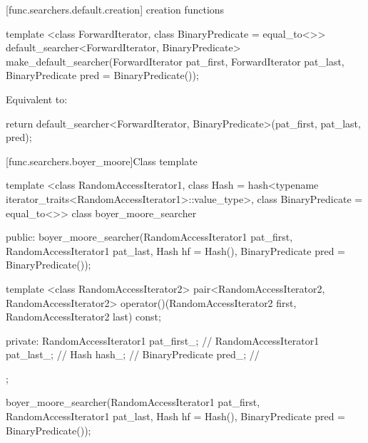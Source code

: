 [func.searchers.default.creation]{ creation functions}

%
\begin{itemdecl}
template <class ForwardIterator, class BinaryPredicate = equal_to<>>
  default_searcher<ForwardIterator, BinaryPredicate>
    make_default_searcher(ForwardIterator pat_first, ForwardIterator pat_last,
                          BinaryPredicate pred = BinaryPredicate());
\end{itemdecl}

\begin{itemdescr}
\pnum
\effects
Equivalent to:
\begin{codeblock}
return default_searcher<ForwardIterator, BinaryPredicate>(pat_first, pat_last, pred);
\end{codeblock}
\end{itemdescr}

[func.searchers.boyer_moore]{Class template }

%
\begin{codeblock}
template <class RandomAccessIterator1,
          class Hash = hash<typename iterator_traits<RandomAccessIterator1>::value_type>,
          class BinaryPredicate = equal_to<>>
class boyer_moore_searcher {
public:
  boyer_moore_searcher(RandomAccessIterator1 pat_first,
                       RandomAccessIterator1 pat_last, Hash hf = Hash(),
                       BinaryPredicate pred = BinaryPredicate());

  template <class RandomAccessIterator2>
    pair<RandomAccessIterator2, RandomAccessIterator2>
      operator()(RandomAccessIterator2 first,
                 RandomAccessIterator2 last) const;

private:
  RandomAccessIterator1 pat_first_; // \expos
  RandomAccessIterator1 pat_last_;  // \expos
  Hash hash_;                       // \expos
  BinaryPredicate pred_;            // \expos
};
\end{codeblock}

%
\begin{itemdecl}
boyer_moore_searcher(RandomAccessIterator1 pat_first,
                     RandomAccessIterator1 pat_last, Hash hf = Hash(),
                     BinaryPredicate pred = BinaryPredicate());
\end{itemdecl}

